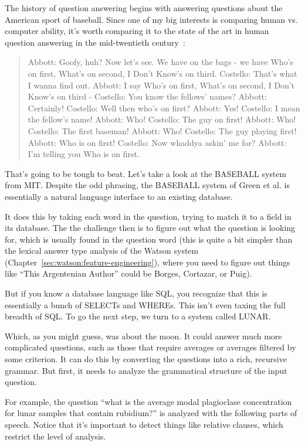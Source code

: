 The history of question answering begins with
answering questions about the American sport
of baseball.
%
Since one of my big interests is comparing human vs. computer ability, it's
worth comparing it to the state of the art in human question
answering in the mid-twentieth century~\cite{sedman-11}:
\begin{quote}
Abbott: Goofy, huh? Now let's see. We have on the bags - we have Who's on first,
What's on second, I Don't Know's on third.
Costello: That's what I wanna find out.
Abbott: I say Who's on first, What's on second, I Don't Know's on third -
Costello: You know the fellows' names?
Abbott: Certainly!
Costello: Well then who's on first?
Abbott: Yes!
Costello: I mean the fellow's name!
Abbott: Who!
Costello: The guy on first!
Abbott: Who!
Costello: The first baseman!
Abbott: Who!
Costello: The guy playing first!
Abbott: Who is on first!
Costello: Now whaddya askin' me for?
Abbott: I'm telling you Who is on first. \citep[pages 1002--1004]{light-16}
\end{quote}

That’s going to be tough to beat.
Let’s take a look at the BASEBALL system
from MIT.
%
Despite the odd phrasing, the BASEBALL system
of Green et al. is essentially a natural language
interface to an existing database.

It does this by taking each word in the question,
trying to match it to a field in its database.
%
The the challenge then is to figure out what
the question is looking for, which is usually
%
found in the question word (this is quite a bit simpler than the lexical
answer type analysis of the Watson system
(Chapter~\ref{sec:watson:feature-engineering}), where you need to figure out
things like ``This Argentenian Author'' could be Borges, Cortazar, or Puig).

But if you know a database language like SQL,
you recognize that this is essentially a bunch
of SELECTs and WHEREs.
%
This isn’t even taxing the full breadth
of SQL.
%
To go the next step, we turn to a system called
LUNAR.

Which, as you might guess, was about the moon.
%
It could answer much more complicated questions,
such as those that require averages or averages
%
filtered by some criterion.
%
It can do this by converting the questions
into a rich, recursive grammar.
%
But first, it needs to analyze the grammatical
structure of the input question.

For example, the question “what is the average
modal plagioclase concentration for lunar
%
samples that contain rubidium?” is analyzed
with the following parts of speech.
%
Notice that it’s important to detect things
like relative clauses, which restrict the
%
level of analysis.

